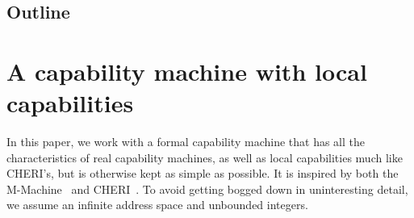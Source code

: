 \documentclass[compsoc,conference,letterpaper,fleqn]{IEEEtran}
\begin{document}




\subsection{Outline}

\section{A capability machine with local capabilities}
In this paper, we work with a formal capability machine that has all the
characteristics of real capability machines, as well as local capabilities much
like CHERI's, but is otherwise kept as simple as possible. It is inspired by
both the M-Machine~\cite{Carter:1994:HSF:195473.195579} and
CHERI~\cite{Watson2015Cheri}. To avoid getting bogged down in uninteresting
detail, we assume an infinite address space and unbounded integers.
\end{document}
